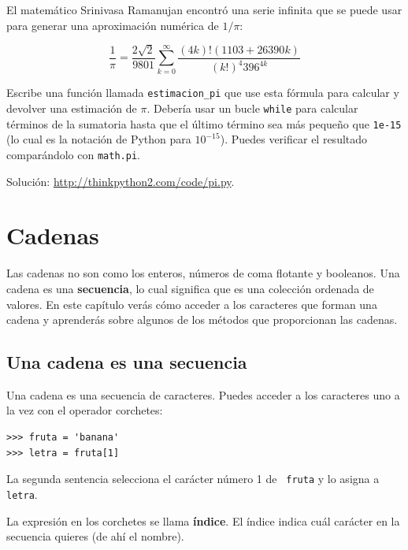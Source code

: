 \documentclass[10pt]{book}
\begin{document}
\begin{exercise}

El matemático Srinivasa Ramanujan encontró una
serie infinita
que se puede usar para generar una aproximación
numérica de $1 / \pi$:

\[ \frac{1}{\pi} = \frac{2\sqrt{2}}{9801}
\sum^\infty_{k=0} \frac{(4k)!(1103+26390k)}{(k!)^4 396^{4k}} \]

Escribe una función llamada \verb"estimacion_pi" que use esta fórmula
para calcular y devolver una estimación de $\pi$.  Debería usar un bucle {\tt while}
para calcular términos de la sumatoria hasta que el último término sea
más pequeño que {\tt 1e-15} (lo cual es la notación de Python para $10^{-15}$).
Puedes verificar el resultado comparándolo con {\tt math.pi}.

Solución: \url{http://thinkpython2.com/code/pi.py}.

\end{exercise}


\chapter{Cadenas}
\label{strings}

Las cadenas no son como los enteros, números de coma flotante y booleanos.  Una cadena
es una {\bf secuencia}, lo cual significa que es
una colección ordenada de valores.  En este capítulo verás
cómo acceder a los caracteres que forman una cadena y
aprenderás sobre algunos de los métodos que proporcionan las cadenas.


\section{Una cadena es una secuencia}

Una cadena es una secuencia de caracteres.
Puedes acceder a los caracteres uno a la vez con el
operador corchetes:

\begin{verbatim}
>>> fruta = 'banana'
>>> letra = fruta[1]
\end{verbatim}
%
La segunda sentencia selecciona el carácter número 1 de {\tt
fruta} y lo asigna a {\tt letra}.

La expresión en los corchetes se llama {\bf índice}.
El índice indica cuál carácter en la secuencia
quieres (de ahí el nombre).
\end{document}

